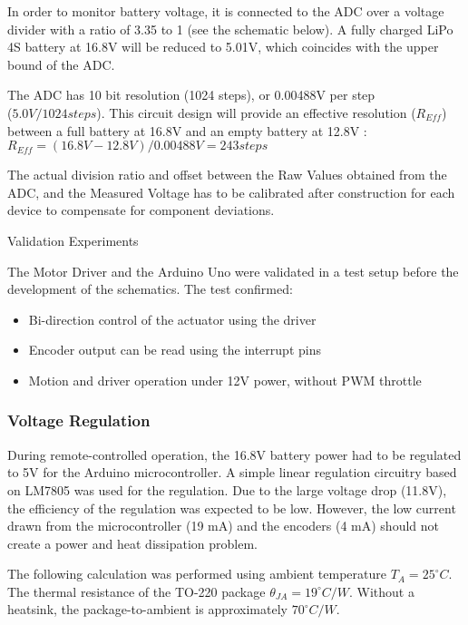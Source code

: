In order to monitor battery voltage, it is connected to the ADC over a voltage divider with a ratio of 3.35 to 1 (see the schematic below). A fully charged LiPo 4S battery at 16.8V will be reduced to 5.01V, which coincides with the upper bound of the ADC. 

The ADC has 10 bit resolution (1024 steps), or 0.00488V per step \\($5.0V / 1024 steps$). This circuit design will provide an effective resolution ($R_{Eff}$) between a full battery at 16.8V and an empty battery at 12.8V : 
\\ $R_{Eff} = (16.8V - 12.8V) / 0.00488V = 243 steps$

The actual division ratio and offset between the Raw Values obtained from the ADC, and the Measured Voltage has to be calibrated after construction for each device to compensate for component deviations. 

Validation Experiments

The Motor Driver and the Arduino Uno were validated in a test setup before the development of the schematics. The test confirmed:
\begin{itemize}
    \item Bi-direction control of the actuator using the driver
    \item Encoder output can be read using the interrupt pins
    \item Motion and driver operation under 12V power, without PWM throttle
\end{itemize}

\subsubsection{Voltage Regulation}

During remote-controlled operation, the 16.8V battery power had to be regulated to 5V for the Arduino microcontroller. A simple linear regulation circuitry based on LM7805 was used for the regulation. Due to the large voltage drop (11.8V), the efficiency of the regulation was expected to be low. However, the low current drawn from the microcontroller (19 mA) and the encoders (4 mA) should not create a power and heat dissipation problem.

The following calculation was performed using ambient temperature $T_A = 25^{\circ}C$. The thermal resistance of the TO-220 package $\theta_{JA} = 19^{\circ}C/W$. Without a heatsink, the package-to-ambient is approximately $70 ^{\circ}C/W$.

